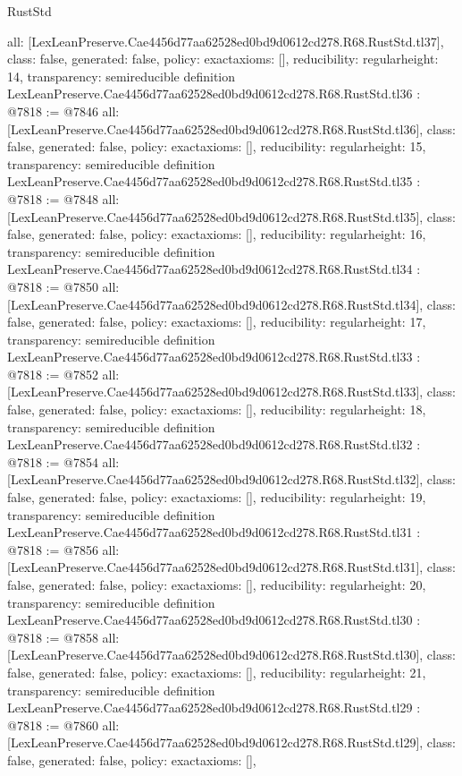 \begin{lexlean}{RustStd}
\begin{coremodule}
{  all: [LexLeanPreserve.Cae4456d77aa62528ed0bd9d0612cd278.R68.RustStd.tl37],
  class: false,
  generated: false,
  policy: exact{axioms: []},
  reducibility: regular{height: 14},
  transparency: semireducible
}
definition LexLeanPreserve.Cae4456d77aa62528ed0bd9d0612cd278.R68.RustStd.tl36 : @7818 := @7846 {
  all: [LexLeanPreserve.Cae4456d77aa62528ed0bd9d0612cd278.R68.RustStd.tl36],
  class: false,
  generated: false,
  policy: exact{axioms: []},
  reducibility: regular{height: 15},
  transparency: semireducible
}
definition LexLeanPreserve.Cae4456d77aa62528ed0bd9d0612cd278.R68.RustStd.tl35 : @7818 := @7848 {
  all: [LexLeanPreserve.Cae4456d77aa62528ed0bd9d0612cd278.R68.RustStd.tl35],
  class: false,
  generated: false,
  policy: exact{axioms: []},
  reducibility: regular{height: 16},
  transparency: semireducible
}
definition LexLeanPreserve.Cae4456d77aa62528ed0bd9d0612cd278.R68.RustStd.tl34 : @7818 := @7850 {
  all: [LexLeanPreserve.Cae4456d77aa62528ed0bd9d0612cd278.R68.RustStd.tl34],
  class: false,
  generated: false,
  policy: exact{axioms: []},
  reducibility: regular{height: 17},
  transparency: semireducible
}
definition LexLeanPreserve.Cae4456d77aa62528ed0bd9d0612cd278.R68.RustStd.tl33 : @7818 := @7852 {
  all: [LexLeanPreserve.Cae4456d77aa62528ed0bd9d0612cd278.R68.RustStd.tl33],
  class: false,
  generated: false,
  policy: exact{axioms: []},
  reducibility: regular{height: 18},
  transparency: semireducible
}
definition LexLeanPreserve.Cae4456d77aa62528ed0bd9d0612cd278.R68.RustStd.tl32 : @7818 := @7854 {
  all: [LexLeanPreserve.Cae4456d77aa62528ed0bd9d0612cd278.R68.RustStd.tl32],
  class: false,
  generated: false,
  policy: exact{axioms: []},
  reducibility: regular{height: 19},
  transparency: semireducible
}
definition LexLeanPreserve.Cae4456d77aa62528ed0bd9d0612cd278.R68.RustStd.tl31 : @7818 := @7856 {
  all: [LexLeanPreserve.Cae4456d77aa62528ed0bd9d0612cd278.R68.RustStd.tl31],
  class: false,
  generated: false,
  policy: exact{axioms: []},
  reducibility: regular{height: 20},
  transparency: semireducible
}
definition LexLeanPreserve.Cae4456d77aa62528ed0bd9d0612cd278.R68.RustStd.tl30 : @7818 := @7858 {
  all: [LexLeanPreserve.Cae4456d77aa62528ed0bd9d0612cd278.R68.RustStd.tl30],
  class: false,
  generated: false,
  policy: exact{axioms: []},
  reducibility: regular{height: 21},
  transparency: semireducible
}
definition LexLeanPreserve.Cae4456d77aa62528ed0bd9d0612cd278.R68.RustStd.tl29 : @7818 := @7860 {
  all: [LexLeanPreserve.Cae4456d77aa62528ed0bd9d0612cd278.R68.RustStd.tl29],
  class: false,
  generated: false,
  policy: exact{axioms: []},
}
\end{coremodule}
\end{lexlean}
